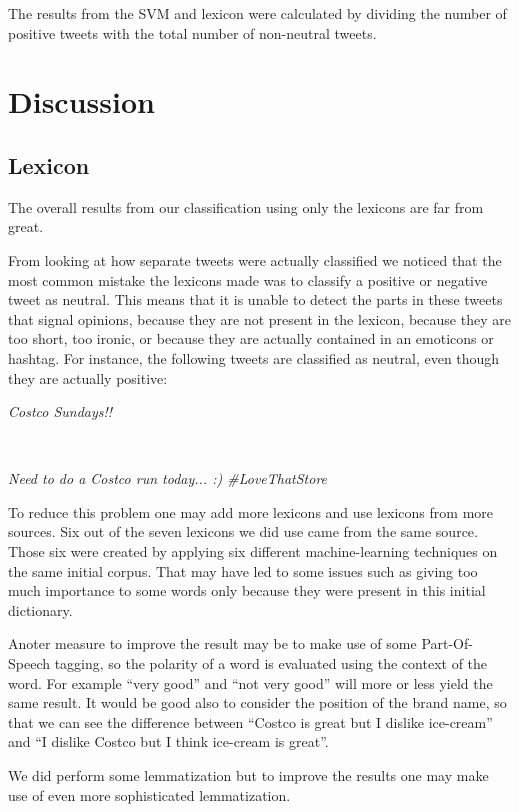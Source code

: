 \documentclass[a4paper,12pt]{report}
\begin{document}
The results from the SVM and lexicon were calculated by dividing the number of positive tweets with the total number of non-neutral tweets.

\chapter{Discussion}

\section{Lexicon}

The overall results from our classification using only the lexicons are far from great. 

From looking at how separate tweets were actually classified we noticed that the most common mistake the lexicons made was to classify a positive or negative tweet as neutral. 
This means that it is unable to detect the parts in these tweets that signal opinions, because they are not present in the lexicon, because they are too short, too ironic, or because they are actually contained in an emoticons or hashtag.
For instance, the following tweets are classified as neutral, even though they are actually positive:\\
\centerline{\textit{Costco Sundays!!}}\\
\centerline{\textit{Need to do a Costco run today... :) \#LoveThatStore}}

To reduce this problem one may add more lexicons and use lexicons from more sources. Six out of the seven lexicons we did use came from the same source. Those six were created by applying six different machine-learning techniques on the same initial corpus. That may have led to some issues such as giving too much importance to some words only because they were present in this initial dictionary.

Anoter measure to improve the result may be to make use of some Part-Of-Speech tagging, so the polarity of a word is evaluated using the context of the word. For example ``very good'' and ``not very good'' will more or less yield the same result. It would be good also to consider the position of the brand name, so that we can see the difference between ``Costco is great but I dislike ice-cream'' and ``I dislike Costco but I think ice-cream is great''.

We did perform some lemmatization but to improve the results one may make use of even more sophisticated lemmatization.
\end{document}
